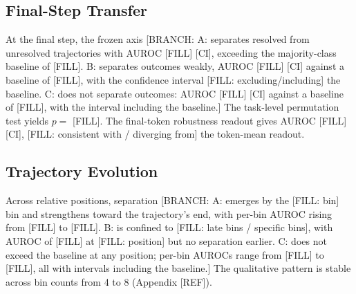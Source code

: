 \documentclass{article}
\begin{document}

\subsection{Final-Step Transfer}

At the final step, the frozen axis [BRANCH:
A: separates resolved from unresolved trajectories with AUROC [FILL] [CI], exceeding the majority-class baseline of [FILL].
B: separates outcomes weakly, AUROC [FILL] [CI] against a baseline of [FILL], with the confidence interval [FILL: excluding/including] the baseline.
C: does not separate outcomes: AUROC [FILL] [CI] against a baseline of [FILL], with the interval including the baseline.]
The task-level permutation test yields $p = $ [FILL]. The final-token robustness readout gives AUROC [FILL] [CI], [FILL: consistent with / diverging from] the token-mean readout.


\subsection{Trajectory Evolution}

Across relative positions, separation [BRANCH:
A: emerges by the [FILL: bin] bin and strengthens toward the trajectory's end, with per-bin AUROC rising from [FILL] to [FILL].
B: is confined to [FILL: late bins / specific bins], with AUROC of [FILL] at [FILL: position] but no separation earlier.
C: does not exceed the baseline at any position; per-bin AUROCs range from [FILL] to [FILL], all with intervals including the baseline.]
The qualitative pattern is stable across bin counts from 4 to 8 (Appendix [REF]).

\end{document}
